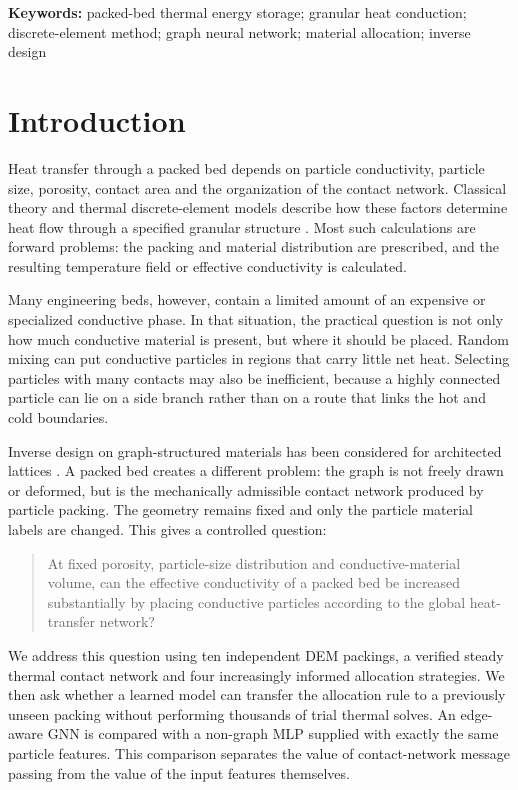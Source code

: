 \documentclass[12pt,a4paper]{article}
\begin{document}
	\noindent\textbf{Keywords:} packed-bed thermal energy storage; granular heat
	conduction; discrete-element method; graph neural network; material allocation;
	inverse design
	
	\section{Introduction}
	
	Heat transfer through a packed bed depends on particle conductivity, particle
	size, porosity, contact area and the organization of the contact network.
	Classical theory and thermal discrete-element models describe how these factors
	determine heat flow through a specified granular structure
	\cite{Batchelor1977,Vargas2001,Kiani2019,Joulin2020}. Most such calculations are
	forward problems: the packing and material distribution are prescribed, and
	the resulting temperature field or effective conductivity is calculated.
	
	Many engineering beds, however, contain a limited amount of an expensive or
	specialized conductive phase. In that situation, the practical question is not
	only how much conductive material is present, but where it should be placed.
	Random mixing can put conductive particles in regions that carry little net
	heat. Selecting particles with many contacts may also be inefficient, because a
	highly connected particle can lie on a side branch rather than on a route that
	links the hot and cold boundaries.
	
	Inverse design on graph-structured materials has been considered for
	architected lattices \cite{Dold2023}. A packed bed creates a different problem:
	the graph is not freely drawn or deformed, but is the mechanically admissible
	contact network produced by particle packing. The geometry remains fixed and
	only the particle material labels are changed. This gives a controlled question:
	
	\begin{quote}
		At fixed porosity, particle-size distribution and conductive-material volume,
		can the effective conductivity of a packed bed be increased substantially by
		placing conductive particles according to the global heat-transfer network?
	\end{quote}
	
	We address this question using ten independent DEM packings, a verified steady
	thermal contact network and four increasingly informed allocation strategies.
	We then ask whether a learned model can transfer the allocation rule to a
	previously unseen packing without performing thousands of trial thermal solves.
	An edge-aware GNN is compared with a non-graph MLP supplied with exactly the
	same particle features. This comparison separates the value of contact-network
	message passing from the value of the input features themselves.
	
\end{document}
